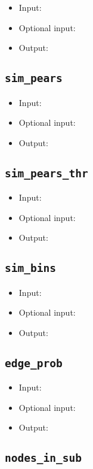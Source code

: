 \documentclass[10pt]{article}
\theoremstyle{definition}
\numberwithin{theorem}{section}
\numberwithin{definition}{section}
\numberwithin{lemma}{section}
\numberwithin{corollary}{section}
\numberwithin{clm}{section}
\numberwithin{rmk}{section}
\begin{document}
\begin{itemize}
	\item Input: 
	\item Optional input:
	\item Output: 
\end{itemize}

\cprotect \subsection{\verb|sim_pears|}

\begin{itemize}
	\item Input: 
	\item Optional input:
	\item Output: 
\end{itemize}

\cprotect \subsection{\verb|sim_pears_thr|}

\begin{itemize}
	\item Input: 
	\item Optional input:
	\item Output: 
\end{itemize}

\cprotect \subsection{\verb|sim_bins|}

\begin{itemize}
	\item Input: 
	\item Optional input:
	\item Output: 
\end{itemize}

\cprotect \subsection{\verb|edge_prob|}

\begin{itemize}
	\item Input: 
	\item Optional input:
	\item Output: 
\end{itemize}

\cprotect \subsection{\verb|nodes_in_sub|}
\end{document}
